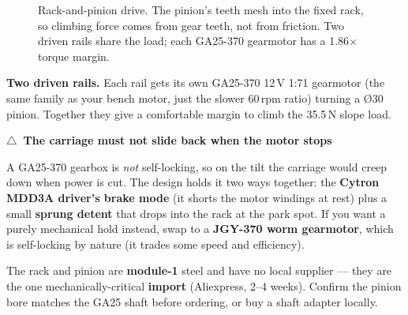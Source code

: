 \documentclass[11pt,a4paper]{article}
\newenvironment{checkbox}[1]
  {\par\medskip\noindent\begin{lrbox}{\gbbox}\begin{minipage}{0.95\linewidth}\footnotesize\textbf{#1}\par\smallskip}
  {\end{minipage}\end{lrbox}\setlength{\fboxsep}{8pt}\fcolorbox{red!60!black}{red!5}{\usebox{\gbbox}}\par\medskip}
\newcommand{\warn}{\textcolor{orange!80!black}{$\triangle$}}
\begin{document}
\begin{figure}[h]
\centering
{}
\caption{Rack-and-pinion drive. The pinion's teeth mesh into the fixed rack, so climbing force comes from
gear teeth, not from friction. Two driven rails share the load; each GA25-370 gearmotor has a 1.86$\times$
torque margin.}
\end{figure}

\textbf{Two driven rails.} Each rail gets its own GA25-370 12\,V 1:71 gearmotor (the same family as your
bench motor, just the slower 60\,rpm ratio) turning a \O30 pinion. Together they give a comfortable
margin to climb the 35.5\,N slope load.

\begin{checkbox}{\warn\ The carriage must not slide back when the motor stops}
A GA25-370 gearbox is \emph{not} self-locking, so on the tilt the carriage would creep down when power is
cut. The design holds it two ways together: the \textbf{Cytron MDD3A driver's brake mode} (it shorts the
motor windings at rest) plus a small \textbf{sprung detent} that drops into the rack at the park spot. If
you want a purely mechanical hold instead, swap to a \textbf{JGY-370 worm gearmotor}, which is
self-locking by nature (it trades some speed and efficiency).
\end{checkbox}

\noindent The rack and pinion are \textbf{module-1} steel and have no local supplier --- they are the one
mechanically-critical \textbf{import} (Aliexpress, 2--4 weeks). Confirm the pinion bore matches the GA25
shaft before ordering, or buy a shaft adapter locally.
\end{document}
